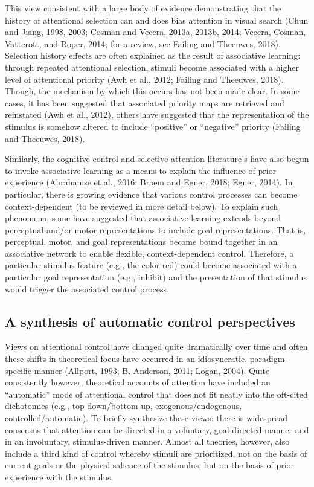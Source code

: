 \documentclass[]{DissertateCUNY}
\begin{document}
This view consistent with a large body of evidence demonstrating that
the history of attentional selection can and does bias attention in
visual search (Chun and Jiang, 1998, 2003; Cosman and Vecera, 2013a,
2013b, 2014; Vecera, Cosman, Vatterott, and Roper, 2014; for a review,
see Failing and Theeuwes, 2018). Selection history effects are often
explained as the result of associative learning: through repeated
attentional selection, stimuli become associated with a higher level of
attentional priority (Awh et al., 2012; Failing and Theeuwes, 2018).
Though, the mechanism by which this occurs has not been made clear. In
some cases, it has been suggested that associated priority maps are
retrieved and reinstated (Awh et al., 2012), others have suggested that
the representation of the stimulus is somehow altered to include
``positive'' or ``negative'' priority (Failing and Theeuwes, 2018).

Similarly, the cognitive control and selective attention literature's
have also begun to invoke associative learning as a means to explain the
influence of prior experience (Abrahamse et al., 2016; Braem and Egner,
2018; Egner, 2014). In particular, there is growing evidence that
various control processes can become context-dependent (to be reviewed
in more detail below). To explain such phenomena, some have suggested
that associative learning extends beyond perceptual and/or motor
representations to include goal representations. That is, perceptual,
motor, and goal representations become bound together in an associative
network to enable flexible, context-dependent control. Therefore, a
particular stimulus feature (e.g., the color red) could become
associated with a particular goal representation (e.g., inhibit) and the
presentation of that stimulus would trigger the associated control
process.

\hypertarget{a-synthesis-of-automatic-control-perspectives}{%
\subsection{A synthesis of automatic control
perspectives}\label{a-synthesis-of-automatic-control-perspectives}}

Views on attentional control have changed quite dramatically over time
and often these shifts in theoretical focus have occurred in an
idiosyncratic, paradigm-specific manner (Allport, 1993; B. Anderson,
2011; Logan, 2004). Quite consistently however, theoretical accounts of
attention have included an ``automatic'' mode of attentional control
that does not fit neatly into the oft-cited dichotomies (e.g.,
top-down/bottom-up, exogenous/endogenous, controlled/automatic). To
briefly synthesize these views: there is widespread consensus that
attention can be directed in a voluntary, goal-directed manner and in an
involuntary, stimulus-driven manner. Almost all theories, however, also
include a third kind of control whereby stimuli are prioritized, not on
the basis of current goals or the physical salience of the stimulus, but
on the basis of prior experience with the stimulus.
\end{document}
